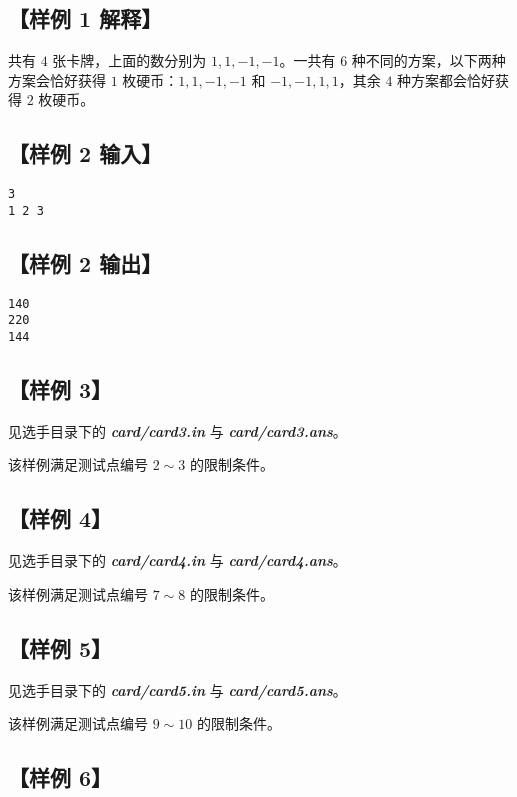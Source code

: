 \documentclass[UTF8]{ctexart}
\newcommand\file[1]{\textbf{\textit{#1}}}
\begin{document}
	\subsection[样例 1 解释]{【样例 1 解释】}

	共有 $4$ 张卡牌，上面的数分别为 $1,1,-1,-1$。一共有 $6$ 种不同的方案，以下两种方案会恰好获得 $1$ 枚硬币：$1,1,-1,-1$ 和 $-1,-1,1,1$，其余 $4$ 种方案都会恰好获得 $2$ 枚硬币。

	\subsection[样例 2 输入]{【样例 2 输入】}
	
	\begin{lstlisting}
3
1 2 3
	\end{lstlisting}
	
	\subsection[样例 2 输出]{【样例 2 输出】}
	
	\begin{lstlisting}
140
220
144
	\end{lstlisting}
	
	\subsection[样例 3]{【样例 3】}
	
	见选手目录下的 \file{card/card3.in} 与 \file{card/card3.ans}。
	
	该样例满足测试点编号 $2\sim 3$ 的限制条件。
	
	\subsection[样例 4]{【样例 4】}
	
	见选手目录下的 \file{card/card4.in} 与 \file{card/card4.ans}。
	
	该样例满足测试点编号 $7\sim 8$ 的限制条件。
	
	\subsection[样例 5]{【样例 5】}
	
	见选手目录下的 \file{card/card5.in} 与 \file{card/card5.ans}。
	
	该样例满足测试点编号 $9\sim 10$ 的限制条件。
	
	\subsection[样例 6]{【样例 6】}
	
\end{document}
